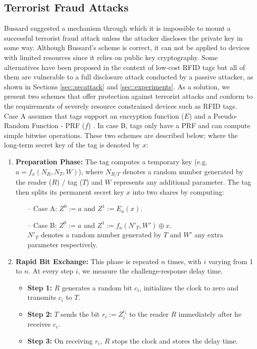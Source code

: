 \documentclass{article}
\begin{document}
\subsection{Terrorist Fraud Attacks}
Bussard \cite{Bussard-2004-thesis,BussardB05} suggested a mechanism through which it is impossible to mount a successful terrorist fraud attack unless the attacker discloses the private key in some way.  Although Bussard's scheme is correct, it can not be applied to devices with limited resources since it relies on public key cryptography.  Some alternatives have been proposed in the context of low-cost RFID tags but all of them are vulnerable to a full disclosure attack conducted by a passive attacker, as shown in Sections \ref{sec::secattack} and \ref{sec::experiments}. As a solution, we present two schemes that offer protection against terrorist attacks and conform to the requirements of severely resource constrained devices such as RFID tags.  Case A assumes that tags support an encryption function ($E$) \cite{BogdanovKLPPRSV-2007-ches,HellJM-2006} and a Pseudo-Random Function - PRF ($f$) \cite{lee-prf-2007}. In case B, tags only have a PRF  and can compute simple bitwise operations. These two schemes are described below; where the long-term secret key of the tag is denoted by  $x$:
     \begin{enumerate}
      \item \textbf{Preparation Phase:}  The tag computes a temporary key (e.g. $ a = f_x(N_{R}, N_{T}, W)$), where $N_{R/T}$ denotes a random number generated by the reader ($R$) / tag ($T$) and $W$ represents any additional parameter.  The tag then splits its permanent secret key $x$ into two shares by computing:
          \begin{itemize}
            \item[--]Case A: $Z^0:=a$ and $Z^1:= E_a(x)$.
            \item[--]Case B: $Z^0:=a$ and $Z^1:= f_a(N'_T, W') \oplus x$. \\
             $N'_T$ denotes a random number generated by $T$ and $W'$ any extra parameter respectively.
          \end{itemize}
      \item \textbf{Rapid Bit Exchange:} This phase is repeated $n$ times, with $i$ varying from 1 to $n$.  At every step $i$, we measure the challenge-response delay time.
    \begin{itemize}
             \item \textbf{Step 1:} $R$  generates a random bit $c_i$, initializes the clock to zero and transmits $c_i$ to $T$.
             \item \textbf{Step 2:} $T$ sends the bit $r_i:=Z_i^{c_i}$ to the reader $R$ immediately after he receives $c_i$.
             \item \textbf{Step 3:} On receiving $r_i$, $R$ stops the clock and stores the delay time.
    \end{itemize}
    \end{enumerate}
\end{document}
